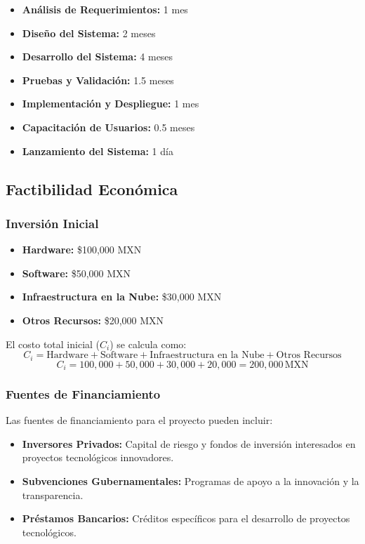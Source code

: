 \documentclass[a4paper,12pt]{article}
\begin{document}
\begin{itemize}
    \item \textbf{Análisis de Requerimientos:} 1 mes
    \item \textbf{Diseño del Sistema:} 2 meses
    \item \textbf{Desarrollo del Sistema:} 4 meses
    \item \textbf{Pruebas y Validación:} 1.5 meses
    \item \textbf{Implementación y Despliegue:} 1 mes
    \item \textbf{Capacitación de Usuarios:} 0.5 meses
    \item \textbf{Lanzamiento del Sistema:} 1 día
\end{itemize}

\subsection{Factibilidad Económica}
\subsubsection{Inversión Inicial}
\begin{itemize}
    \item \textbf{Hardware:} \$100,000 MXN
    \item \textbf{Software:} \$50,000 MXN
    \item \textbf{Infraestructura en la Nube:} \$30,000 MXN
    \item \textbf{Otros Recursos:} \$20,000 MXN
\end{itemize}

El costo total inicial (\(C_i\)) se calcula como:
\[
C_i = \text{Hardware} + \text{Software} + \text{Infraestructura en la Nube} + \text{Otros Recursos}
\]
\[
C_i = 100,000 + 50,000 + 30,000 + 20,000 = 200,000 \, \text{MXN}
\]

\subsubsection{Fuentes de Financiamiento}
Las fuentes de financiamiento para el proyecto pueden incluir:

\begin{itemize}
    \item \textbf{Inversores Privados:} Capital de riesgo y fondos de inversión interesados en proyectos tecnológicos innovadores.
    \item \textbf{Subvenciones Gubernamentales:} Programas de apoyo a la innovación y la transparencia.
    \item \textbf{Préstamos Bancarios:} Créditos específicos para el desarrollo de proyectos tecnológicos.
\end{itemize}
\end{document}
